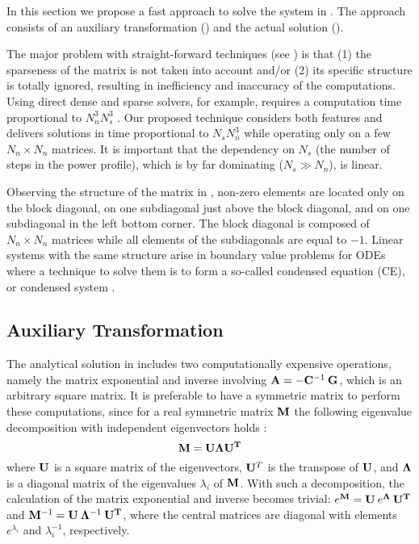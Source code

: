 In this section we propose a fast approach to solve the system in .
The approach consists of an auxiliary transformation () and
the actual solution ().

The major problem with straight-forward techniques (see )
is that (1) the sparseness of the matrix is not taken into account and/or (2)
its specific structure is totally ignored, resulting in inefficiency and
inaccuracy of the computations. Using direct dense and sparse solvers, for
example, requires a computation time proportional to $N_n^3 N_s^3$
\cite{press2007}. Our proposed technique considers both features and delivers
solutions in time proportional to $N_s N_n^3$ while operating only on a few $N_n
\times N_n$ matrices. It is important that the dependency on $N_s$ (the number
of steps in the power profile), which is by far dominating ($N_s \gg N_n$), is
linear.

Observing the structure of the matrix in , non-zero elements are
located only on the block diagonal, on one subdiagonal just above the block
diagonal, and on one subdiagonal in the left bottom corner. The block diagonal
is composed of $N_n \times N_n$ matrices while all elements of the subdiagonals
are equal to $-1$. Linear systems with the same structure arise in boundary
value problems for ODEs where a technique to solve them is to form a so-called
condensed equation (CE), or condensed system \cite{stoer2002}.

\subsection{Auxiliary Transformation} 

The analytical solution in  includes two computationally
expensive operations, namely the matrix exponential and inverse involving
\mbox{$\mathbf{A} = - \mathbf{C}^{-1} \: \mathbf{G}$}, which is an arbitrary square matrix. It
is preferable to have a symmetric matrix to perform these computations, since
for a real symmetric matrix $\mathbf{M}$ the following eigenvalue decomposition with
independent eigenvectors holds \cite{press2007}:
\begin{equation} \elab{eigenvalue-decomposition}
  \m{M} = \m{U} \m{\Lambda} \m{U}^\v{T}
\end{equation}
where $\mathbf{U}$ is a square matrix of the eigenvectors, $\mathbf{U}^T$ is the transpose
of $\mathbf{U}$, and $\mathbf{\Lambda}$ is a diagonal matrix of the eigenvalues
$\lambda_i$ of $\mathbf{M}$. With such a decomposition, the calculation of the matrix
exponential and inverse becomes trivial: $e^{\mathbf{M}} = \mathbf{U} \: e^{\mathbf{\Lambda}} \:
\mathbf{U}^{\mathbf{T}}$ and $\mathbf{M}^{-1} = \mathbf{U} \: \mathbf{\Lambda}^{-1} \: \mathbf{U}^{\mathbf{T}}$, where
the central matrices are diagonal with elements $e^{\lambda_i}$ and
$\lambda_i^{-1}$, respectively.

